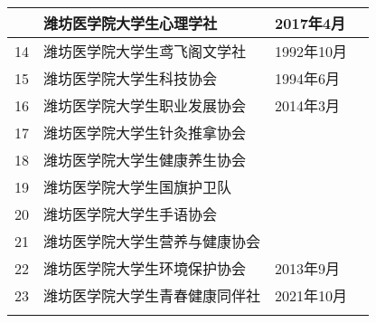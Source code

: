 \begin{center}
\begin{tabular}{|>{\centering\arraybackslash}p{2em}|>{\centering\arraybackslash}p{20em}|%
        >{\centering\arraybackslash}p{6em}|>{\centering\arraybackslash}p{5em}|}
        13 & 潍坊医学院大学生心理学社                  & 2017年4月  &                        \\
        \cline{1-3}
        14 & 潍坊医学院大学生鸢飞阁文学社                & 1992年10月 &                        \\
        \Xhline{1.2pt}
        15 & 潍坊医学院大学生科技协会                  & 1994年6月  & \multirow{2}{*}{创新创业类} \\
        \cline{1-3}
        16 & 潍坊医学院大学生职业发展协会                & 2014年3月  &                        \\
        \Xhline{1.2pt}
        17 & 潍坊医学院大学生针灸推拿协会                &          & \multirow{7}{*}{自律互助类} \\
        \cline{1-3}
        18 & 潍坊医学院大学生健康养生协会                &          &                        \\
        \cline{1-3}
        19 & 潍坊医学院大学生国旗护卫队                 &          &                        \\
        \cline{1-3}
        20 & 潍坊医学院大学生手语协会                  &          &                        \\
        \cline{1-3}
        21 & 潍坊医学院大学生营养与健康协会               &          &                        \\
        \cline{1-3}
        22 & 潍坊医学院大学生环境保护协会                & 2013年9月  &                        \\
        \cline{1-3}
        23 & 潍坊医学院大学生青春健康同伴社               & 2021年10月 &                        \\
        \Xhline{1.2pt}
    \end{tabular}
\end{center}

